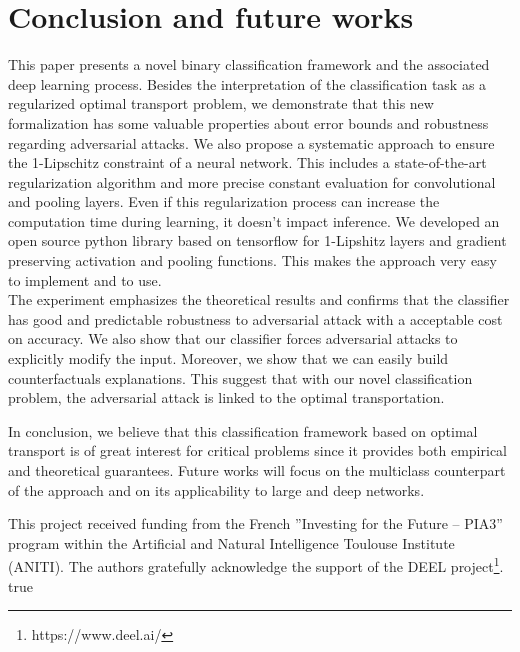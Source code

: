 \documentclass{article}
\begin{document}
 


\section{Conclusion and future works}
This paper presents a novel binary classification framework and the associated deep learning process. Besides the interpretation of the classification task as a regularized optimal transport problem, we demonstrate that this new formalization has some valuable properties about error bounds and robustness regarding adversarial attacks. We also propose a systematic approach to ensure the 1-Lipschitz constraint of a neural network. This includes a state-of-the-art regularization algorithm and more precise constant evaluation for convolutional and pooling layers. Even if this regularization process can increase the computation time during learning, it doesn't impact inference. We developed an open source python library based on tensorflow for 1-Lipshitz layers and gradient preserving activation and pooling functions. This makes the approach very easy to implement and to use. \\

The experiment emphasizes the theoretical results and confirms that the classifier has good and predictable robustness to adversarial attack with a acceptable cost on accuracy. We also show that our classifier forces adversarial attacks to explicitly modify the input. Moreover, we show that we can easily build counterfactuals explanations. This suggest that with our novel classification problem, the adversarial attack is linked to the optimal transportation.

In conclusion, we believe that this classification framework based on optimal transport is of great interest for critical problems since it provides both empirical and theoretical guarantees. Future works will focus on the multiclass counterpart of the approach and on its applicability to large and deep networks.

\acksection
This project received funding from the French ”Investing for the Future – PIA3” program within the Artiﬁcial and Natural Intelligence Toulouse Institute (ANITI). The authors gratefully acknowledge the support of the DEEL project\footnote{https://www.deel.ai/}.
\if@submission \@submission true
\newpage
\end{document}

